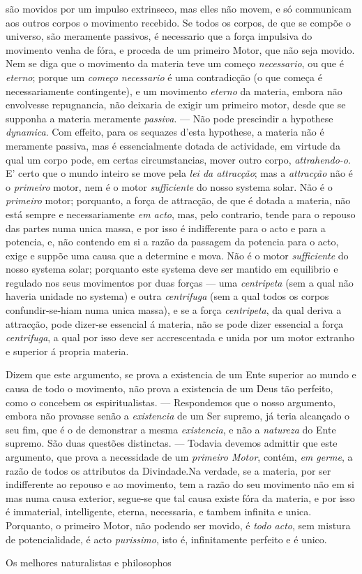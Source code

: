 são movidos por um impulso extrinseco, mas elles não movem, e só communicam aos outros corpos o movimento recebido. Se todos os corpos, de que se compõe o universo, são meramente passivos, é necessario que a força impulsiva do movimento venha de fóra, e proceda de um primeiro Motor, que não seja movido. Nem se diga que o movimento da materia teve um começo \emph{necessario}, ou que é \emph{eterno}; porque um \emph{começo necessario} é uma contradicção (o que começa é necessariamente contingente), e um movimento \emph{eterno} da materia, embora não envolvesse repugnancia, não deixaria de exigir um primeiro motor, desde que se supponha a materia meramente \emph{passiva}. --- Não pode prescindir a hypothese \emph{dynamica}. Com effeito, para os sequazes d'esta hypothese, a materia não é meramente passiva, mas é essencialmente dotada de actividade, em virtude da qual um corpo pode, em certas circumstancias, mover outro corpo, \emph{attrahendo-o}. E' certo que o mundo inteiro se move pela \emph{lei da attracção}; mas a \emph{attracção} não é o \emph{primeiro} motor, nem é o motor \emph{sufficiente} do nosso systema solar. Não é o \emph{primeiro} motor; porquanto, a força de attracção, de que é dotada a materia, não está sempre e necessariamente \emph{em acto}, mas, pelo contrario, tende para o repouso das partes numa unica massa, e por isso é indifferente para o acto e para a potencia, e, não contendo em si a razão da passagem da potencia para o acto, exige e suppõe uma causa que a determine e mova. Não é o motor \emph{sufficiente} do nosso systema solar; porquanto este systema deve ser mantido em equilibrio e regulado nos seus movimentos por duas forças --- uma \emph{centripeta} (sem a qual não haveria unidade no systema) e outra \emph{centrifuga} (sem a qual todos os corpos confundir-se-hiam numa unica massa), e se a força \emph{centripeta}, da qual deriva a attracção, pode dizer-se essencial á materia, não se pode dizer essencial a força \emph{centrifuga}, a qual por isso deve ser accrescentada e unida por um motor extranho e superior á propria materia.\par Dizem que este argumento, se prova a existencia de um Ente superior ao mundo e causa de todo o movimento, não prova a existencia de um Deus tão perfeito, como o concebem os espiritualistas. --- Respondemos que o nosso argumento, embora não provasse senão a \emph{existencia} de um Ser supremo, já teria alcançado o seu fim, que é o de demonstrar a mesma \emph{existencia}, e não a \emph{natureza} do Ente supremo. São duas questões distinctas. --- Todavia devemos admittir que este argumento, que prova a necessidade de um \emph{primeiro Motor}, contém, \emph{em germe}, a razão de todos os attributos da Divindade.Na verdade, se a materia, por ser indifferente ao repouso e ao movimento, tem a razão do seu movimento não em si mas numa causa exterior, segue-se que tal causa existe fóra da materia, e por isso é immaterial, intelligente, eterna, necessaria, e tambem infinita e unica. Porquanto, o primeiro Motor, não podendo ser movido, é \emph{todo acto}, sem mistura de potencialidade, é acto \emph{purissimo}, isto é, infinitamente perfeito e é unico.\par Os melhores naturalistas e philosophos 